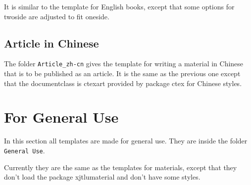 It is similar to the template for English books, except that some options for twoside are adjusted to fit oneside.

\subsection{Article in Chinese}
The folder \verb=Article_zh-cn= gives the template for writing a material in Chinese that is to be published as an article. It is the same as the previous one except that the documentclass is ctexart provided by package ctex for Chinese styles.

\section{For General Use}
In this section all templates are made for general use. They are inside the folder \verb|General Use|.

Currently they are the same as the templates for materials, except that they don't load the package xjtlumaterial and don't have some styles.
